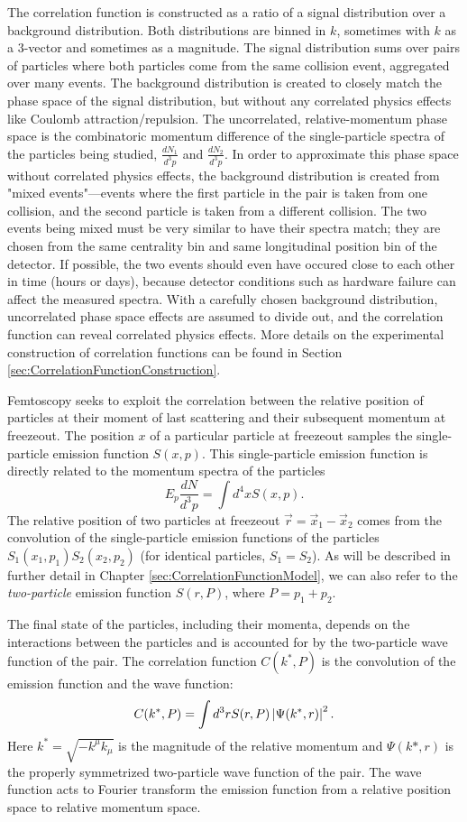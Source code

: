 The correlation function is constructed as a ratio of a signal distribution over a background distribution.
Both distributions are binned in $k$, sometimes with $k$ as a 3-vector and sometimes as a magnitude.
The signal distribution sums over pairs of particles where both particles come from the same collision event, aggregated over many events.
The background distribution is created to closely match the phase space of the signal distribution, but without any correlated physics effects like Coulomb attraction/repulsion.
The uncorrelated, relative-momentum phase space is the combinatoric momentum difference of the single-particle spectra of the particles being studied, $\frac{dN_1}{d^3 p}$ and $\frac{dN_2}{d^3 p}$.
In order to approximate this phase space without correlated physics effects, the background distribution is created from "mixed events"---events where the first particle in the pair is taken from one collision, and the second particle is taken from a different collision.
The two events being mixed must be very similar to have their spectra match; they are chosen from the same centrality bin and same longitudinal position bin of the detector.
If possible, the two events should even have occured close to each other in time (hours or days), because detector conditions such as hardware failure can affect the measured spectra.
With a carefully chosen background distribution, uncorrelated phase space effects are assumed to divide out, and the correlation function can reveal correlated physics effects.
More details on the experimental construction of correlation functions can be found in Section \ref{sec:CorrelationFunctionConstruction}.

Femtoscopy seeks to exploit the correlation between the relative position of particles at their moment of last scattering and their subsequent momentum at freezeout.
The position $x$ of a particular particle at freezeout samples the single-particle emission function $S(x,p)$.
This single-particle emission function is directly related to the momentum spectra of the particles
$$E_p \frac{dN}{d^3p} = \int d^4x S(x,p).$$
The relative position of two particles at freezeout $\vec{r} = \vec{x}_1 - \vec{x}_2$ comes from the convolution of the single-particle emission functions of the particles $S_1(x_1,p_1)S_2(x_2,p_2)$ (for identical particles, $S_1 = S_2$).
As will be described in further detail in Chapter \ref{sec:CorrelationFunctionModel}, we can also refer to the \textit{two-particle} emission function $S(r,P)$, where $P = p_1 + p_2$.

The final state of the particles, including their momenta, depends on the interactions between the particles and is accounted for by the two-particle wave function of the pair.
The correlation function $C(k^*,P)$ is the convolution of the emission function and the wave function:
\begin{equation}
\label{eq:KooninPrattInIntro}
C(k^*,P) =  \int d^3r S(r,P) \left\lvert\Psi(k^*,r)\right\rvert^2.
\end{equation}
Here $k^* = \sqrt{-k^\mu k_\mu}$ is the magnitude of the relative momentum and $\Psi(k*,r)$ is the properly symmetrized two-particle wave function of the pair.
The wave function acts to Fourier transform the emission function from a relative position space to relative momentum space.

